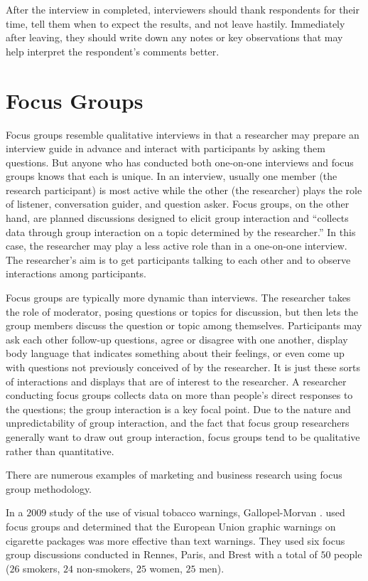 After the interview in completed, interviewers should thank respondents for their time, tell them when to expect the results, and not leave hastily. Immediately after leaving, they should write down any notes or key observations that may help interpret the respondent's comments better.

\section{Focus Groups}

Focus groups resemble qualitative interviews in that a researcher may prepare an interview guide in advance and interact with participants by asking them questions. But anyone who has conducted both one-on-one interviews and focus groups knows that each is unique. In an interview, usually one member (the research participant) is most active while the other (the researcher) plays the role of listener, conversation guider, and question asker. Focus groups, on the other hand, are planned discussions designed to elicit group interaction and ``collects data through group interaction on a topic determined by the researcher.'' \cite{morgan1996focus} In this case, the researcher may play a less active role than in a one-on-one interview. The researcher's aim is to get participants talking to each other and to observe interactions among participants.

Focus groups are typically more dynamic than interviews. The researcher takes the role of moderator, posing questions or topics for discussion, but then lets the group members discuss the question or topic among themselves. Participants may ask each other follow-up questions, agree or disagree with one another, display body language that indicates something about their feelings, or even come up with questions not previously conceived of by the researcher. It is just these sorts of interactions and displays that are of interest to the researcher. A researcher conducting focus groups collects data on more than people's direct responses to the questions; the group interaction is a key focal point. Due to the nature and unpredictability of group interaction, and the fact that focus group researchers generally want to draw out group interaction, focus groups tend to be qualitative rather than quantitative.

There are numerous examples of marketing and business research using focus group methodology. 

In a $ 2009 $ study of the use of visual tobacco warnings, Gallopel-Morvan \etal. used focus groups and determined that the European Union graphic warnings on cigarette packages was more effective than text warnings. \cite{gallopel2011use} They used six focus group discussions conducted in Rennes, Paris, and Brest with a total of $ 50 $ people ($ 26 $ smokers, $ 24 $ non-smokers, $ 25 $ women, $ 25 $ men). 

